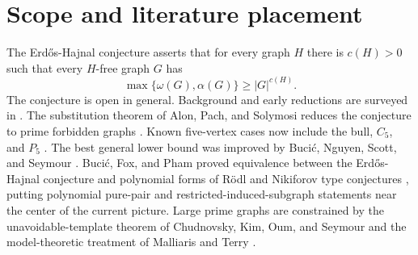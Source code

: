 \begin{abstract}
This note is a trimmed and conservative version of working notes around the Erd\H{o}s-Hajnal conjecture. It does not claim to prove the conjecture, and it does not claim priority for any standard-looking lemma. The aim is to isolate a few locally checkable obstructions to tempting reductions: a singleton-cut obstruction to bounded affine-cell occupancy in level-two shadows, exact path-profile and first-splitter obstructions outside a witness path, a semantic gap after ordered cutpoint canonization, a correction to a two-anchor blockade notion, and a local rooted $P_4$ crossing-trace obstruction. The emphasis is on statements that are short enough to be checked or refuted by readers, with folklore-sensitive framing and explicit open questions.
\end{abstract}

\maketitle

\section{Scope and literature placement}

The Erd\H{o}s-Hajnal conjecture asserts that for every graph $H$ there is $c(H)>0$ such that every $H$-free graph $G$ has
\[
  \max\{\omega(G),\alpha(G)\}\ge |G|^{c(H)}.
\]
The conjecture is open in general. Background and early reductions are surveyed in \cite{ChudnovskySurvey2014}. The substitution theorem of Alon, Pach, and Solymosi reduces the conjecture to prime forbidden graphs \cite{AlonPachSolymosi2001}. Known five-vertex cases now include the bull, $C_5$, and $P_5$ \cite{ChudnovskySafra2008Bull,ChudnovskyScottSeymourSpirkl2023C5,NguyenScottSeymour2026P5}. The best general lower bound was improved by Buci\'c, Nguyen, Scott, and Seymour \cite{BucicNguyenScottSeymour2024DensityI}. Buci\'c, Fox, and Pham proved equivalence between the Erd\H{o}s-Hajnal conjecture and polynomial forms of R\"odl and Nikiforov type conjectures \cite{BucicFoxPham2024}, putting polynomial pure-pair and restricted-induced-subgraph statements near the center of the current picture. Large prime graphs are constrained by the unavoidable-template theorem of Chudnovsky, Kim, Oum, and Seymour and the model-theoretic treatment of Malliaris and Terry \cite{ChudnovskyKimOumSeymour2016,MalliarisTerry2018}.

